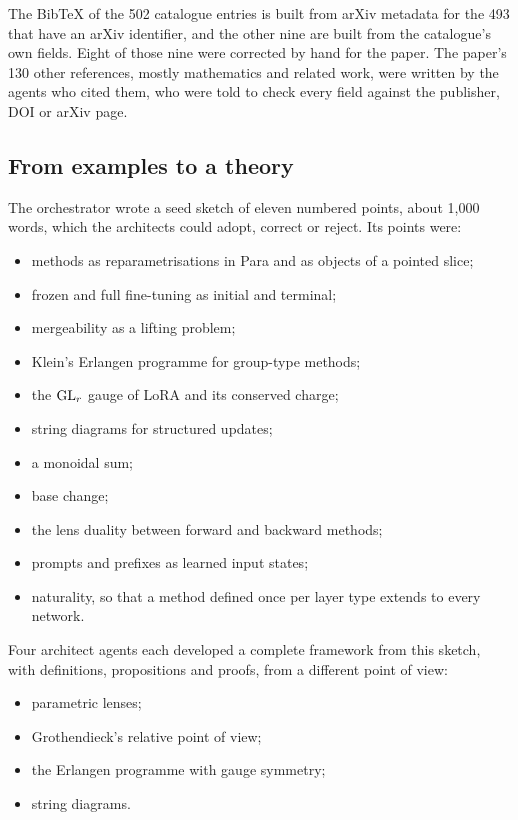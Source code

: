 The BibTeX of the 502 catalogue entries is built from arXiv metadata for the 493 that have an arXiv identifier, and the other nine are built from the catalogue's own fields. Eight of those nine were corrected by hand for the paper. The paper's 130 other references, mostly mathematics and related work, were written by the agents who cited them, who were told to check every field against the publisher, DOI or arXiv page.

\subsection{From examples to a theory}

The orchestrator wrote a seed sketch of eleven numbered points, about 1,000 words, which the architects could adopt, correct or reject. Its points were:

\begin{itemize}
\item methods as reparametrisations in Para and as objects of a pointed slice;
\item frozen and full fine-tuning as initial and terminal;
\item mergeability as a lifting problem;
\item Klein's Erlangen programme for group-type methods;
\item the $\mathrm{GL}_r$ gauge of LoRA and its conserved charge;
\item string diagrams for structured updates;
\item a monoidal sum;
\item base change;
\item the lens duality between forward and backward methods;
\item prompts and prefixes as learned input states;
\item naturality, so that a method defined once per layer type extends to every network.
\end{itemize}

Four architect agents each developed a complete framework from this sketch, with definitions, propositions and proofs, from a different point of view:

\begin{itemize}
\item parametric lenses;
\item Grothendieck's relative point of view;
\item the Erlangen programme with gauge symmetry;
\item string diagrams.
\end{itemize}

